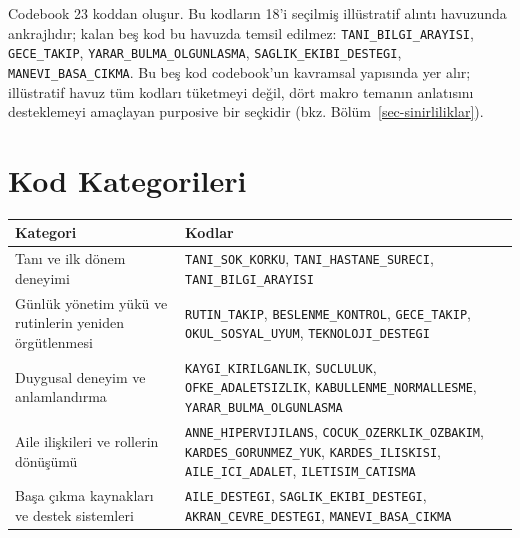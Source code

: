 \documentclass[
  turkish,
  a4paper,
  DIV=11,
  numbers=noendperiod]{scrreprt}
\newcounter{none} %
\begin{document}
Codebook 23 koddan oluşur. Bu kodların 18'i seçilmiş illüstratif alıntı
havuzunda ankrajlıdır; kalan beş kod bu havuzda temsil edilmez:
\texttt{TANI\_BILGI\_ARAYISI}, \texttt{GECE\_TAKIP},
\texttt{YARAR\_BULMA\_OLGUNLASMA}, \texttt{SAGLIK\_EKIBI\_DESTEGI},
\texttt{MANEVI\_BASA\_CIKMA}. Bu beş kod codebook'un kavramsal yapısında
yer alır; illüstratif havuz tüm kodları tüketmeyi değil, dört makro
temanın anlatısını desteklemeyi amaçlayan purposive bir seçkidir (bkz.
Bölüm~\ref{sec-sinirliliklar}).

\section{Kod Kategorileri}\label{kod-kategorileri}

{\def\LTcaptype{none} %
\begin{longtable}[]{@{}
  >{\raggedright\arraybackslash}p{}
  >{\raggedright\arraybackslash}p{}@{}}
\toprule\noalign{}
\begin{minipage}[b]{\linewidth}\raggedright
Kategori
\end{minipage} & \begin{minipage}[b]{\linewidth}\raggedright
Kodlar
\end{minipage} \\
\midrule\noalign{}
\endhead
\bottomrule\noalign{}
\endlastfoot
Tanı ve ilk dönem deneyimi & \texttt{TANI\_SOK\_KORKU},
\texttt{TANI\_HASTANE\_SURECI}, \texttt{TANI\_BILGI\_ARAYISI} \\
Günlük yönetim yükü ve rutinlerin yeniden örgütlenmesi &
\texttt{RUTIN\_TAKIP}, \texttt{BESLENME\_KONTROL}, \texttt{GECE\_TAKIP},
\texttt{OKUL\_SOSYAL\_UYUM}, \texttt{TEKNOLOJI\_DESTEGI} \\
Duygusal deneyim ve anlamlandırma & \texttt{KAYGI\_KIRILGANLIK},
\texttt{SUCLULUK}, \texttt{OFKE\_ADALETSIZLIK},
\texttt{KABULLENME\_NORMALLESME}, \texttt{YARAR\_BULMA\_OLGUNLASMA} \\
Aile ilişkileri ve rollerin dönüşümü & \texttt{ANNE\_HIPERVIJILANS},
\texttt{COCUK\_OZERKLIK\_OZBAKIM}, \texttt{KARDES\_GORUNMEZ\_YUK},
\texttt{KARDES\_ILISKISI}, \texttt{AILE\_ICI\_ADALET},
\texttt{ILETISIM\_CATISMA} \\
Başa çıkma kaynakları ve destek sistemleri & \texttt{AILE\_DESTEGI},
\texttt{SAGLIK\_EKIBI\_DESTEGI}, \texttt{AKRAN\_CEVRE\_DESTEGI},
\texttt{MANEVI\_BASA\_CIKMA} \\
\end{longtable}
}
\end{document}
